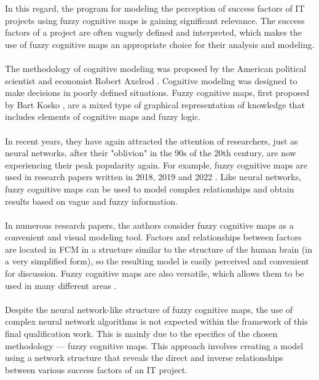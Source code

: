 \documentclass{article}
\begin{document}
    \hfill
    \begin{minipage}{0.49\textwidth}
        In this regard, the program for modeling the perception of success factors of IT projects using fuzzy cognitive maps is gaining significant relevance. The success factors of a project are often vaguely defined and interpreted, which makes the use of fuzzy cognitive maps an appropriate choice for their analysis and modeling.\\
        ~\\
        The methodology of cognitive modeling was proposed by the American political scientist and economist Robert Axelrod \cite{litlink12}. Cognitive modeling was designed to make decisions in poorly defined situations. Fuzzy cognitive maps, first proposed by Bart Kosko \cite{litlink13}, are a mixed type of graphical representation of knowledge that includes elements of cognitive maps and fuzzy logic.\\
        ~\\
        In recent years, they have again attracted the attention of researchers, just as neural networks, after their "{}oblivion"{} in the 90s of the 20th century, are now experiencing their peak popularity again. For example, fuzzy cognitive maps are used in research papers written in 2018, 2019 and 2022 \cite{litlink14, litlink15, litlink16}. Like neural networks, fuzzy cognitive maps can be used to model complex relationships and obtain results based on vague and fuzzy information.\\
        ~\\
        In numerous research papers, the authors consider fuzzy cognitive maps as a convenient and visual modeling tool. Factors and relationships between factors are located in FCM in a structure similar to the structure of the human brain (in a very simplified form), so the resulting model is easily perceived and convenient for discussion. Fuzzy cognitive maps are also versatile, which allows them to be used in many different areas \cite{litlink17}.\\
        ~\\
        Despite the neural network-like structure of fuzzy cognitive maps, the use of complex neural network algorithms is not expected within the framework of this final qualification work. This is mainly due to the specifics of the chosen methodology — fuzzy cognitive maps. This approach involves creating a model using a network structure that reveals the direct and inverse relationships between various success factors of an IT project.\\
        ~\\
        \begin{center}

\end{center}
\end{minipage}
\end{document}
